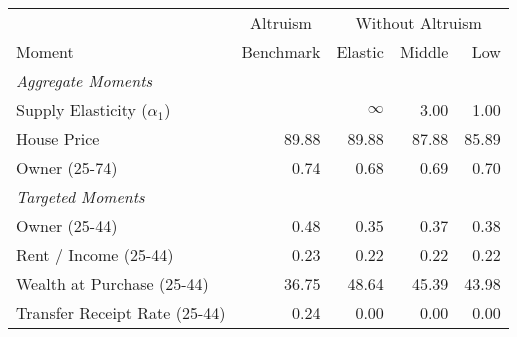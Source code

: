 \begin{tabular}{lrrrr}
 \toprule & \multicolumn{1}{c}{Altruism} & \multicolumn{3}{c}{Without Altruism}  \\  \cmidrule(lr){2-2} \cmidrule(lr){3-5} 

Moment & Benchmark & Elastic & Middle & Low\\
\midrule
\textit{Aggregate Moments} &  &  &  & \\
\;Supply Elasticity ($\alpha_1$) &  & $ \infty $ & 3.00 & 1.00\\
\;House Price & 89.88 & 89.88 & 87.88 & 85.89\\
\;Owner (25-74) & 0.74 & 0.68 & 0.69 & 0.70\\
\textit{Targeted Moments} &  &  &  & \\
\;Owner (25-44) & 0.48 & 0.35 & 0.37 & 0.38\\
\;Rent / Income (25-44) & 0.23 & 0.22 & 0.22 & 0.22\\
\;Wealth at Purchase (25-44) & 36.75 & 48.64 & 45.39 & 43.98\\
\;Transfer Receipt Rate (25-44) & 0.24 & 0.00 & 0.00 & 0.00\\
\bottomrule
\end{tabular}
